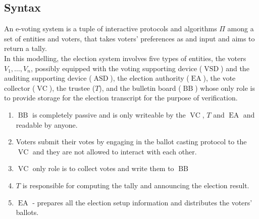 \documentclass[12pt]{article}
\DeclareMathOperator{\vsd}{VSD}
\DeclareMathOperator{\asd}{ASD}
\DeclareMathOperator{\ea}{EA}
\DeclareMathOperator{\bb}{BB}
\DeclareMathOperator{\voc}{VC}
\begin{document}
\subsection{Syntax} 
An e-voting system is a tuple of interactive protocols and algorithms $\Pi$ among a set of entities and voters, that takes  voters' preferences as and input and aims to return a tally. \\

In this modelling, the election system involves five types of entities, the voters $V_1, \dots , V_n$, possibly equipped with the voting supporting device ($\vsd$) and the auditing supporting device ($\asd$), the election authority ($\ea$), the vote collector ($\voc$), the trustee ($T$), and the bulletin board ($\bb$) whose only role is to provide storage for the election transcript for the purpose of verification. 
\begin{enumerate}
\item $\bb$ is completely passive and is only writeable by the $\voc$, $T$ and $\ea$ and readable by anyone. 
\item Voters submit their votes by engaging in the ballot casting protocol to the $\voc$ and they are not allowed to interact with each other. 
\item $\voc$ only role is to collect votes and write them to $\bb$
\item $T$ is responsible for computing the tally and announcing the election result.
\item $\ea$ - prepares all the election setup information and distributes the voters' ballots.
\end{enumerate}
\end{document}
